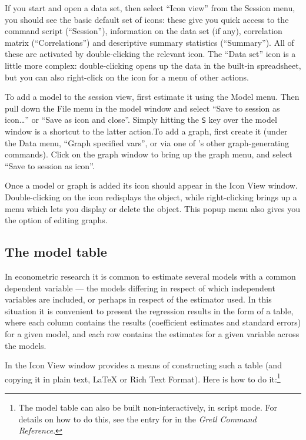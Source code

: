 If you start  and open a data set, then select ``Icon
view'' from the Session menu, you should see the basic default set of
icons: these give you quick access to the command script
(``Session''), information on the data set (if any), correlation
matrix (``Correlations'') and descriptive summary statistics
(``Summary''). All of these are activated by double-clicking the
relevant icon.  The ``Data set'' icon is a little more complex:
double-clicking opens up the data in the built-in spreadsheet, but you
can also right-click on the icon for a menu of other actions.

To add a model to the session view, first estimate it using the Model
menu.  Then pull down the File menu in the model window and select
``Save to session as icon\dots{}'' or ``Save as icon and close''.
Simply hitting the \verb+S+ key over the model window is a shortcut to
the latter action.To add a graph, first create it (under the Data
menu, ``Graph specified vars'', or via one of 's other
graph-generating commands).  Click on the graph window to bring up the
graph menu, and select ``Save to session as icon''.

Once a model or graph is added its icon should appear in the Icon View
window.  Double-clicking on the icon redisplays the object, while
right-clicking brings up a menu which lets you display or delete the
object.  This popup menu also gives you the option of editing graphs.

\subsection{The model table}
\label{model-table}

In econometric research it is common to estimate several models with a
common dependent variable --- the models differing in respect of which
independent variables are included, or perhaps in respect of the
estimator used.  In this situation it is convenient to present the
regression results in the form of a table, where each column contains
the results (coefficient estimates and standard errors) for a given
model, and each row contains the estimates for a given variable across
the models.  

In the Icon View window  provides a means of constructing
such a table (and copying it in plain text, {\LaTeX} or Rich Text
Format).  Here is how to do it:\footnote{The model table can also be
  built non-interactively, in script mode.  For details on how to do
  this, see the entry for  in the \emph{Gretl Command
    Reference}.  }
      
